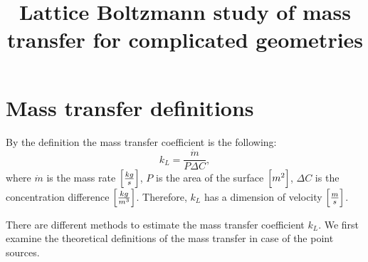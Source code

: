 \documentclass{article}
\title{Lattice Boltzmann study of mass transfer for complicated geometries}
\newcommand{\beq}{\begin{equation}}
\newcommand{\feq}{\end{equation}}
\begin{document}
\maketitle
\section{Mass transfer definitions}
By the definition the mass transfer coefficient is the following:
\beq
k_L=\frac{\dot{m}}{P \Delta C},
\feq
where $\dot{m}$ is the mass rate $\Bigl[\frac{kg}{s}\Bigr]$, $P$ is the area of the surface
$\Bigl[m^2\Bigr]$, $\Delta C$ is the concentration difference $\Bigl[\frac{kg}{m^3}\Bigr]$.
Therefore, $k_L$ has a dimension of velocity $\Bigl[\frac{m}{s}\Bigr]$. 

There are different methods to estimate the mass transfer coefficient $k_L$. We first examine the
theoretical definitions of the mass transfer in case of the point sources.
\end{document}

